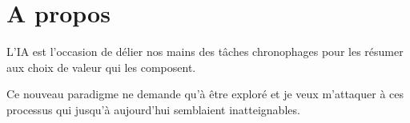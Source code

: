 \section{A propos}
L'IA est l'occasion de délier nos mains des tâches chronophages pour les résumer aux choix de valeur qui les composent.




Ce nouveau paradigme ne demande qu'à être exploré et je veux m'attaquer à ces processus qui jusqu'à aujourd'hui semblaient inatteignables.
\sectionspace %
